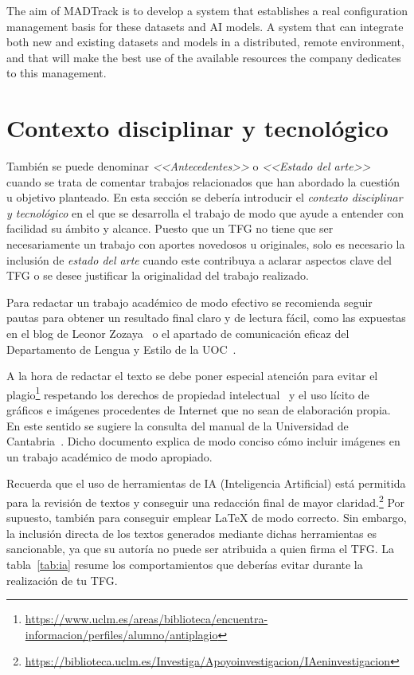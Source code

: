 The aim of MADTrack is to develop a system that establishes a real configuration management basis for these datasets and AI models. A system that can integrate
both new and existing datasets and models in a distributed, remote environment, and that will make the best use of the available resources the company dedicates
to this management.

\section{Contexto disciplinar y tecnológico}
También se puede denominar \emph{<<Antecedentes>>} o \emph{<<Estado del arte>>} cuando se trata de comentar trabajos relacionados que han abordado la cuestión u objetivo planteado. En esta sección se debería introducir el \emph{contexto disciplinar y tecnológico} en el que se desarrolla el trabajo de modo que ayude a entender con facilidad su ámbito y alcance. Puesto que un TFG no tiene que ser necesariamente un trabajo con aportes novedosos u originales, solo es necesario la inclusión de \emph{estado del arte} cuando este contribuya a aclarar aspectos clave del TFG o se desee justificar la originalidad del trabajo realizado.

Para redactar un trabajo académico de modo efectivo se recomienda seguir pautas para obtener un resultado final claro y de lectura fácil, como las expuestas en el blog de Leonor Zozaya~\cite{zozaya17} o el apartado de comunicación eficaz del Departamento de Lengua y Estilo de la UOC~\cite{uoc}.

A la hora de redactar el texto se debe poner especial atención para evitar el plagio\footnote{\url{https://www.uclm.es/areas/biblioteca/encuentra-informacion/perfiles/alumno/antiplagio}} respetando los derechos de propiedad intelectual~\cite{uc3m21} y el uso lícito de gráficos e imágenes procedentes de Internet que no sean de elaboración propia. En este sentido se sugiere la consulta del manual de la Universidad de Cantabria~\cite{unican18}. Dicho documento explica de modo conciso cómo incluir imágenes en un trabajo académico de modo apropiado.

Recuerda que el uso de herramientas de IA (Inteligencia Artificial) está permitida para la revisión de textos y conseguir una redacción final de mayor claridad.\footnote{\url{https://biblioteca.uclm.es/Investiga/Apoyoinvestigacion/IAeninvestigacion}} Por supuesto, también para conseguir emplear \LaTeX{} de modo correcto. Sin embargo, la inclusión directa de los textos generados mediante dichas herramientas es sancionable, ya que su autoría no puede ser atribuida a quien firma el TFG. La tabla~\ref{tab:ia} resume los comportamientos que deberías evitar durante la realización de tu TFG.


